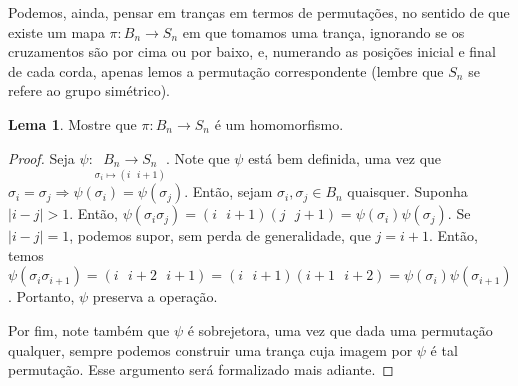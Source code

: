 \documentclass[a4paper,portuguese,11pt,twoside, leqno]{book}
\theoremstyle{definition}
\newtheorem{lemma}[theorem]{Lema}
\begin{document}
	
	
	\par\vspace{0.3cm} Podemos, ainda, pensar em tranças em termos de permutações, no sentido de que existe um mapa $\pi: B_n\to S_n$ em que tomamos uma trança, ignorando se os cruzamentos são por cima ou por baixo, e, numerando as posições inicial e final de cada corda, apenas lemos a permutação correspondente (lembre que $S_n$ se refere ao grupo simétrico).
	
	\par\vspace{0.3cm}
	
	\begin{lemma}
		\label{B_n iso S_n}
		Mostre que $\pi: B_n\to S_n$ é um homomorfismo.
	\end{lemma}
	
	\begin{proof}
		Seja $\psi:\underset{\sigma_i\mapsto(i\text{ }i+1)}{B_n\to S_n}$. Note que $\psi$ está bem definida, uma vez que $\sigma_i=\sigma_j\Rightarrow\psi(\sigma_i)=\psi(\sigma_j)$. Então, sejam $\sigma_i,\sigma_j\in B_n$ quaisquer. Suponha $|i-j|>1$. Então, $\psi(\sigma_i\sigma_j)=(i\text{ } i+1)(j\text{ } j+1)=\psi(\sigma_i)\psi(\sigma_j)$. Se $|i-j|=1$, podemos supor, sem perda de generalidade, que $j=i+1$. Então, temos $\psi(\sigma_i\sigma_{i+1})=(i\text{ } i+2\text{ } i+1)=(i\text{ } i+1)(i+1\text{ } i+2)=\psi(\sigma_i)\psi(\sigma_{i+1})$. Portanto, $\psi$ preserva a operação. 
		\par\vspace{0.3cm} Por fim, note também que $\psi$ é sobrejetora, uma vez que dada uma permutação qualquer, sempre podemos construir uma trança cuja imagem por $\psi$ é tal permutação. Esse argumento será formalizado mais adiante.
	\end{proof}
	
	\par\vspace{0.3cm}
	
\end{document}
